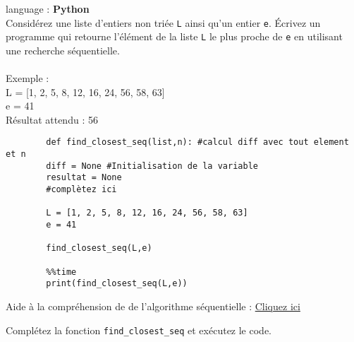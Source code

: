\begin{Exercice}[5 minutes] language : \textbf{Python}\\

Considérez une liste d’entiers non triée \lstinline{L} ainsi qu’un entier \lstinline{e}. Écrivez un programme qui retourne l'élément de la liste \lstinline{L} le plus proche de \lstinline{e} en utilisant une recherche séquentielle.\\\\
Exemple :\\
L = [1, 2, 5, 8, 12, 16, 24, 56, 58, 63] \\
e = 41\\
Résultat attendu : 56\\

    \begin{lstlisting}
        def find_closest_seq(list,n): #calcul diff avec tout element et n
        diff = None #Initialisation de la variable
        resultat = None
        #complètez ici
            
        L = [1, 2, 5, 8, 12, 16, 24, 56, 58, 63] 
        e = 41

        find_closest_seq(L,e)
        
        %%time 
        print(find_closest_seq(L,e))
    \end{lstlisting}

    \begin{conseil}
        Aide à la compréhension de de l'algorithme séquentielle : \href{https://runestone.academy/runestone/books/published/pythonds/SortSearch/TheSequentialSearch.html\#lst-seqsearchpython}{Cliquez ici}
    \end{conseil}
    \begin{solution}
        Complétez la fonction \lstinline{find_closest_seq} et exécutez le code. 
    \end{solution}
\end{Exercice}

